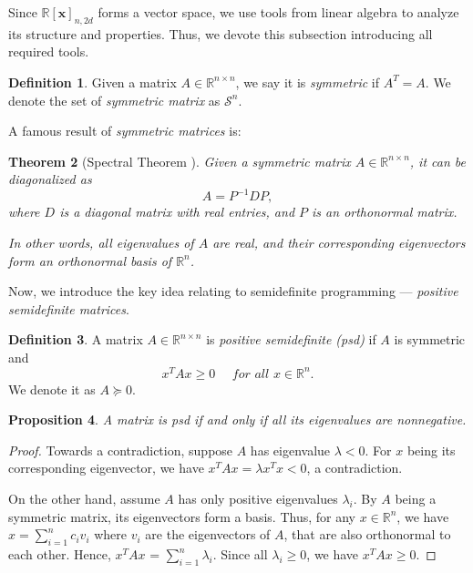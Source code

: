 \documentclass[12pt]{amsart}
\numberwithin{equation}{section}
\newtheorem{thm}{Theorem}
\newtheorem{prop}[thm]{Proposition}
\theoremstyle{definition}
\newtheorem{definition}[thm]{Definition}
\numberwithin{thm}{section}
\begin{document}
Since $\mathbb{R}[\mathbf{x}]_{n, 2d}$ forms a vector space, we use tools from linear algebra 
to analyze its structure and properties.
Thus, we devote this subsection introducing all required tools. 

\begin{definition}
     Given a matrix $A \in \mathbb{R}^{n \times n}$, we say it is \emph{symmetric} if $A^T = A$. We denote the set of \emph{symmetric matrix} as $\mathcal{S}^n$.  
\end{definition}

A famous result of \emph{symmetric matrices} is:
\begin{thm} [Spectral Theorem \cite{golub1996matrix}]

     Given a symmetric matrix $A \in \mathbb{R}^{n \times n}$, 
     it can be diagonalized as \begin{equation*} A = P^{-1}DP, \end{equation*}
     where $D$ is a diagonal matrix with real entries, and $P$ is an orthonormal matrix.
     
     In other words, all eigenvalues of $A$ are real, and their corresponding eigenvectors form an orthonormal basis of $\mathbb{R}^n$. 
\end{thm} 

\smallskip

Now, we introduce the key idea relating to semidefinite programming --- \emph{positive semidefinite matrices}.

\begin{definition}
     A matrix $A \in \mathbb{R}^{n \times n}$ is \emph{positive semidefinite (psd)} if $A$ is symmetric and \begin{equation*}
          x^T A x \geq 0 \quad \textit{ for all } x \in \mathbb{R}^n.
     \end{equation*}
     We denote it as $A \succcurlyeq 0$.
\end{definition}

\begin{prop}
     A matrix is psd if and only if all its eigenvalues are nonnegative.
\end{prop}

\begin{proof}
     Towards a contradiction, suppose $A$ has eigenvalue $\lambda < 0$.
     For $x$ being its corresponding eigenvector, we have $x^T A x = \lambda x^T x < 0$, a contradiction.
     
     On the other hand, assume $A$ has only positive eigenvalues $\lambda_i$. 
     By $A$ being a symmetric matrix, 
     its eigenvectors form a basis. 
     Thus, for any $x \in \mathbb{R}^n$, we have
     $x = \sum_{i = 1} ^ n c_i v_i $ where $v_i$ are the eigenvectors of $A$, that are also orthonormal to each other.
     Hence, $x^T A x$ = $\sum_{i = 1} ^ n \lambda_i$. Since all $\lambda_i \geq 0$, we have $x ^ T A x \geq 0$.
\end{proof}
\end{document}
